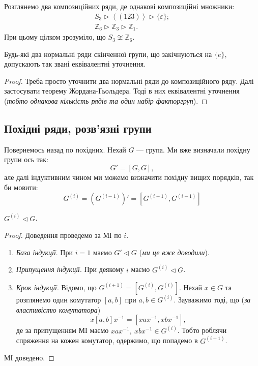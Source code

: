 \documentclass{math_library}
\begin{document}
\begin{example}
Розглянемо два композиційних ряди, де однакові композиційні множники:
\begin{align*}
S_3 \triangleright \left< (123) \right> \triangleright \{\varepsilon\}; \\
\mathbb{Z}_6 \triangleright \mathbb{Z}_3 \triangleright \mathbb{Z}_1.
\end{align*}
При цьому цілком зрозуміло, що $S_3 \not\cong \mathbb{Z}_6$.
\end{example}

\begin{theorem}
Будь-які два нормальні ряди скінченної групи, що закічнуються на $\{e\}$, допускають так звані еквівалентні уточнення.
\end{theorem}

\begin{proof}
Треба просто уточнити два нормальні ряди до композиційного ряду. Далі застосувати теорему Жордана-Гьольдера. Тоді в них еквівалентні уточнення (\textit{тобто однакова кількість рядів та один набір факторгруп}).
\end{proof}
\fi

\subsection{Похідні ряди, розв'язні групи}
Повернемось назад по похідних. Нехай $G$ --- група. Ми вже визначали похідну групи ось так:
\[
G' = [G,G],
\]
але далі індуктивним чином ми можемо визначити похідну вищих порядків, так би мовити:
\[
G^{(i)} = \left(G^{(i-1)}\right)' = \left[G^{(i-1)}, G^{(i-1)}\right]
\]

\begin{proposition}
\label{i_derived_subgroup_is_normal}
$G^{(i)} \triangleleft G$.
\end{proposition}

\begin{proof}
Доведення проведемо за МІ по $i$.
\begin{enumerate}[nosep,wide=0pt,label={\Roman*.}]
\item \textit{База індукції}. При $i = 1$ маємо $G' \triangleleft G$ (\textit{ми це вже доводили}).

\item \textit{Припущення індукції}. При деякому $i$ маємо $G^{(i)} \triangleleft G$.

\item \textit{Крок індукції}. Відомо, що $G^{(i+1)} = [G^{(i)},G^{(i)}]$. Нехай $x \in G$ та розглянемо один комутатор $[a,b]$ при $a,b \in G^{(i)}$. Зауважимо тоді, що (\textit{за властивістю комутатора})
\[
x [a,b] x^{-1} = [xax^{-1}, xbx^{-1}],
\]
де за припущенням МІ маємо $xax^{-1},\ xbx^{-1} \in G^{(i)}$. Тобто роблячи спряження на кожен комутатор, одержимо, що попадемо в $G^{(i+1)}$.
\end{enumerate}
МІ доведено.
\end{proof}
\end{document}
